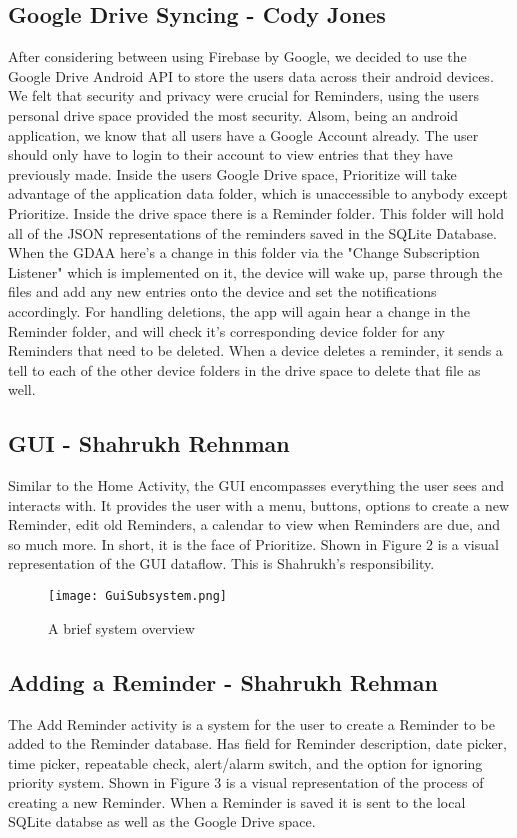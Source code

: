 \documentclass[12pt]{article}
\begin{document}
\subsection{Google Drive Syncing - Cody Jones}
After considering between using Firebase by Google, we decided to use the Google Drive Android API to store the users data across their android devices. We felt that security and privacy were crucial for Reminders, using the users personal drive space provided the most security. Alsom, being an android application, we know that all users have a Google Account already. The user should only have to login to their account to view entries that they have previously made. Inside the users Google Drive space, Prioritize will take advantage of the application data folder, which is unaccessible to anybody except Prioritize. Inside the drive space there is a Reminder folder. This folder will hold all of the JSON representations of the reminders saved in the SQLite Database. When the GDAA here's a change in this folder via the "Change Subscription Listener" which is implemented on it, the device will wake up, parse through the files and add any new entries onto the device and set the notifications accordingly. For handling deletions, the app will again hear a change in the Reminder folder, and will check it's corresponding device folder for any Reminders that need to be deleted. When a device deletes a reminder, it sends a tell to each of the other device folders in the drive space to delete that file as well. 

\subsection{GUI - Shahrukh Rehnman}
Similar to the Home Activity, the GUI encompasses everything the user sees and interacts with. It provides the user with a menu, buttons, options to create a new Reminder, edit old Reminders, a calendar to view when Reminders are due, and so much more. In short, it is the face of Prioritize. Shown in Figure 2 is a visual representation of the GUI dataflow. This is Shahrukh's responsibility.

\begin{figure}[h]
\texttt{[image: GuiSubsystem.png]}
\centering
\caption{A brief system overview}
\end{figure}

\subsection{Adding a Reminder - Shahrukh Rehman}
The Add Reminder activity is a system for the user to create a Reminder to be added to the Reminder database. Has field for Reminder description, date picker, time picker, repeatable check, alert/alarm switch, and the option for ignoring priority system. Shown in Figure 3 is a visual representation of the process of creating a new Reminder. When a Reminder is saved it is sent to the local SQLite databse as well as the Google Drive space. 
\end{document}
